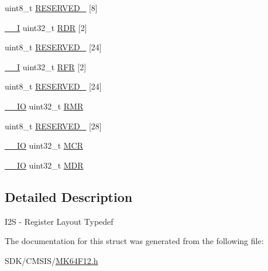 \begin{DoxyCompactItemize}
\item 
uint8\+\_\+t \mbox{\hyperlink{group___v_r_e_f___peripheral___access___layer_ga71033e44d51c3ca5bd7d938bf1685d47}{R\+E\+S\+E\+R\+V\+E\+D\+\_}} \mbox{[}8\mbox{]}
\item 
\mbox{\hyperlink{core__cm4_8h_af63697ed9952cc71e1225efe205f6cd3}{\+\_\+\+\_\+I}} uint32\+\_\+t \mbox{\hyperlink{group___v_r_e_f___peripheral___access___layer_gaa97af36158211310136147fda0520b5e}{R\+DR}} \mbox{[}2\mbox{]}
\item 
uint8\+\_\+t \mbox{\hyperlink{group___v_r_e_f___peripheral___access___layer_gaaf405456524d9a896032b2d5360a1b7e}{R\+E\+S\+E\+R\+V\+E\+D\+\_}} \mbox{[}24\mbox{]}
\item 
\mbox{\hyperlink{core__cm4_8h_af63697ed9952cc71e1225efe205f6cd3}{\+\_\+\+\_\+I}} uint32\+\_\+t \mbox{\hyperlink{group___v_r_e_f___peripheral___access___layer_ga210275a17eb72f5b784d3cbf55217661}{R\+FR}} \mbox{[}2\mbox{]}
\item 
uint8\+\_\+t \mbox{\hyperlink{group___v_r_e_f___peripheral___access___layer_ga7ba5060aa714d2b81fe98e158a77524e}{R\+E\+S\+E\+R\+V\+E\+D\+\_}} \mbox{[}24\mbox{]}
\item 
\mbox{\hyperlink{core__cm4_8h_aec43007d9998a0a0e01faede4133d6be}{\+\_\+\+\_\+\+IO}} uint32\+\_\+t \mbox{\hyperlink{group___v_r_e_f___peripheral___access___layer_gaed92ad6e80b4c577d8f78cb77ac11f4e}{R\+MR}}
\item 
uint8\+\_\+t \mbox{\hyperlink{group___v_r_e_f___peripheral___access___layer_ga8f61329171a8b4d554f60e46471ef6e7}{R\+E\+S\+E\+R\+V\+E\+D\+\_}} \mbox{[}28\mbox{]}
\item 
\mbox{\hyperlink{core__cm4_8h_aec43007d9998a0a0e01faede4133d6be}{\+\_\+\+\_\+\+IO}} uint32\+\_\+t \mbox{\hyperlink{group___v_r_e_f___peripheral___access___layer_ga27af4e9f888f0b7b1e8da7e002d98798}{M\+CR}}
\item 
\mbox{\hyperlink{core__cm4_8h_aec43007d9998a0a0e01faede4133d6be}{\+\_\+\+\_\+\+IO}} uint32\+\_\+t \mbox{\hyperlink{group___v_r_e_f___peripheral___access___layer_gae43f5aa9a8b7b52312047fe51eb0a8c2}{M\+DR}}
\end{DoxyCompactItemize}


\subsection{Detailed Description}
I2S -\/ Register Layout Typedef 

The documentation for this struct was generated from the following file\+:\begin{DoxyCompactItemize}
\item 
S\+D\+K/\+C\+M\+S\+I\+S/\mbox{\hyperlink{_m_k64_f12_8h}{M\+K64\+F12.\+h}}\end{DoxyCompactItemize}
